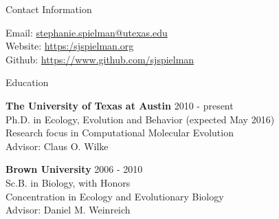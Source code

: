 \documentclass{resume} %
\begin{document}

\begin{rSection}{Contact Information}

\vspace*{0.5cm}

Email: \href{mailto:stephanie.spielman@utexas.edu}{stephanie.spielman@utexas.edu} \\
Website: \url{https:/sjspielman.org} \\ 
Github: \url{https://www.github.com/sjspielman} \\ 

\end{rSection}



\begin{rSection}{Education}
	
\vspace*{0.5cm}

{\bf The University of Texas at Austin} \hfill {2010 - present} \\ 
Ph.D. in Ecology, Evolution and Behavior (expected May 2016) \\
Research focus in Computational Molecular Evolution \\
Advisor: Claus O. Wilke \\

\smallskip

{\bf Brown University} \hfill {2006 - 2010} \\ 
Sc.B. in Biology, with Honors \\
Concentration in Ecology and Evolutionary Biology \\
Advisor: Daniel M. Weinreich \\



\end{rSection}

\end{document}
